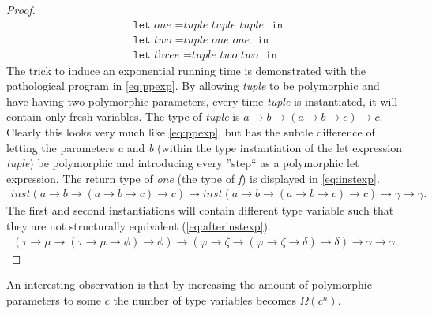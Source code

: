 \begin{proof}
\begin{align}
      &\texttt{let } \textit{one } = \textit{tuple } \textit{tuple } \textit{tuple } \texttt{ in } \tag*{}\\
      &\texttt{let } \textit{two } = \textit{tuple } \textit{one } \textit{one } \texttt{ in } \tag*{}\\
      &\texttt{let } \textit{three } = \textit{tuple } \textit{two } \textit{two } \texttt{ in } \tag*{}
    \end{align}
    The trick to induce an exponential running time is demonstrated with the pathological program in \autoref{eq:ppexp}.
    By allowing \textit{tuple} to be polymorphic and have having two polymorphic parameters, every time \textit{tuple} is instantiated, it will contain only fresh variables.
    The type of \textit{tuple} is $a \rightarrow b \rightarrow (a \rightarrow b \rightarrow c) \rightarrow c$.
    Clearly this looks very much like \autoref{eq:ppexp}, but has the subtle difference of letting the parameters \textit{a} and \textit{b} (within the type instantiation of the let expression \textit{tuple}) be polymorphic and introducing every ''step`` as a polymorphic let expression.
    The return type of \textit{one} (the type of \textit{f}) is displayed in \autoref{eq:instexp}.
    \begin{align}
        \textit{inst}(a \rightarrow b \rightarrow (a \rightarrow b \rightarrow c) \rightarrow c) \rightarrow \textit{inst}(a \rightarrow b \rightarrow (a \rightarrow b \rightarrow c) \rightarrow c) \rightarrow \gamma \rightarrow \gamma.
        \label{eq:instexp}
    \end{align}
    The first and second instantiations will contain different type variable such that they are not structurally equivalent (\autoref{eq:afterinstexp}).
    \begin{align}
        (\tau \rightarrow \mu \rightarrow (\tau \rightarrow \mu \rightarrow \phi) \rightarrow \phi) \rightarrow (\varphi \rightarrow \zeta \rightarrow (\varphi \rightarrow \zeta \rightarrow \delta) \rightarrow \delta) \rightarrow \gamma \rightarrow \gamma.
        \label{eq:afterinstexp}
    \end{align}
\end{proof}
An interesting observation is that by increasing the amount of polymorphic parameters to some $c$ the number of type variables becomes $\Omega(c^n)$.
